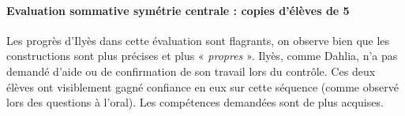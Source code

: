 \paragraph{Evaluation sommative symétrie centrale : copies d'élèves de 5\\}
Les progrès d'Ilyès dans cette évaluation sont flagrants, on observe bien que les constructions sont plus précises et plus « \textit{propres} ». Ilyès, comme Dahlia, n'a pas demandé d'aide ou de confirmation de son travail lors du contrôle. Ces deux élèves ont visiblement gagné confiance en eux sur cette séquence (comme observé lors des questions à l'oral). Les compétences demandées sont de plus acquises.
\begin{figure}[!h]
	\centering
	\qquad

\end{figure}
